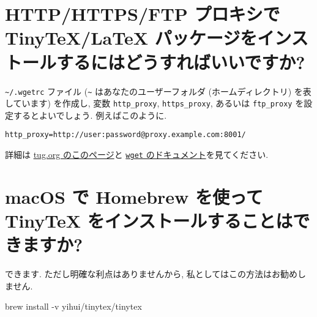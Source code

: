 \documentclass[
  xelatex,ja=standard,jafont=noto]{bxjsreport}
\newenvironment{Shaded}{\begin{snugshade}}{\end{snugshade}}
\newcommand{\AttributeTok}[1]{\textcolor[rgb]{0.77,0.63,0.00}{#1}}
\newcommand{\ExtensionTok}[1]{#1}
\newcommand{\NormalTok}[1]{#1}
\begin{document}
\hypertarget{httphttpsftp-ux30d7ux30edux30adux30b7ux3067-tinytexlatex-ux30d1ux30c3ux30b1ux30fcux30b8ux3092ux30a4ux30f3ux30b9ux30c8ux30fcux30ebux3059ux308bux306bux306fux3069ux3046ux3059ux308cux3070ux3044ux3044ux3067ux3059ux304b}{%
\section{HTTP/HTTPS/FTP プロキシで TinyTeX/LaTeX
パッケージをインストールするにはどうすればいいですか?}\label{httphttpsftp-ux30d7ux30edux30adux30b7ux3067-tinytexlatex-ux30d1ux30c3ux30b1ux30fcux30b8ux3092ux30a4ux30f3ux30b9ux30c8ux30fcux30ebux3059ux308bux306bux306fux3069ux3046ux3059ux308cux3070ux3044ux3044ux3067ux3059ux304b}}

\texttt{\textasciitilde{}/.wgetrc} ファイル (\texttt{\textasciitilde{}}
はあなたのユーザーフォルダ (ホームディレクトリ) を表しています)
を作成し, 変数 \texttt{http\_proxy}, \texttt{https\_proxy}, あるいは
\texttt{ftp\_proxy} を設定するとよいでしょう. 例えばこのように.

\begin{verbatim}
http_proxy=http://user:password@proxy.example.com:8001/
\end{verbatim}

詳細は
\href{https://www.tug.org/texlive/acquire-netinstall.html}{tug.org
のこのページ}と
\href{https://www.gnu.org/software/wget/manual/html_node/Proxies.html}{\texttt{wget}
のドキュメント}を見てください.

\hypertarget{macos-ux3067-homebrew-ux3092ux4f7fux3063ux3066-tinytex-ux3092ux30a4ux30f3ux30b9ux30c8ux30fcux30ebux3059ux308bux3053ux3068ux306fux3067ux304dux307eux3059ux304b}{%
\section{macOS で Homebrew を使って TinyTeX
をインストールすることはできますか?}\label{macos-ux3067-homebrew-ux3092ux4f7fux3063ux3066-tinytex-ux3092ux30a4ux30f3ux30b9ux30c8ux30fcux30ebux3059ux308bux3053ux3068ux306fux3067ux304dux307eux3059ux304b}}

できます. ただし明確な利点はありませんから,
私としてはこの方法はお勧めしません.

\begin{Shaded}
\begin{Highlighting}[]
\ExtensionTok{brew}\NormalTok{ install }\AttributeTok{{-}v}\NormalTok{ yihui/tinytex/tinytex}
\end{Highlighting}
\end{Shaded}
\end{document}
